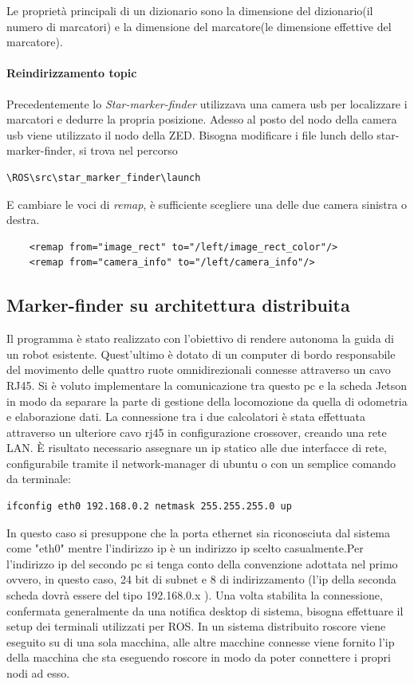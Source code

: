 \documentclass[a4paper]{article}
\begin{document}
Le proprietà principali di un dizionario sono la dimensione del dizionario(il numero di marcatori) e la dimensione del marcatore(le dimensione effettive del marcatore).
\paragraph{Reindirizzamento topic}
Precedentemente lo \textit{Star-marker-finder} utilizzava una camera usb per localizzare i marcatori e dedurre la propria posizione. Adesso al posto del nodo della camera usb viene utilizzato il nodo della ZED.
Bisogna modificare i file lunch dello star-marker-finder, si trova nel percorso
\begin{verbatim}
\ROS\src\star_marker_finder\launch
\end{verbatim}
E cambiare le voci di \textit{remap}, è sufficiente scegliere una delle due camera sinistra o destra.
\begin{verbatim}
    <remap from="image_rect" to="/left/image_rect_color"/>
    <remap from="camera_info" to="/left/camera_info"/>
\end{verbatim}

\subsection{Marker-finder su architettura distribuita}
Il programma è stato realizzato con l'obiettivo di rendere autonoma la guida di un robot esistente. 
Quest'ultimo è dotato di un computer di bordo responsabile del movimento delle quattro ruote omnidirezionali connesse attraverso un cavo RJ45.
Si è voluto implementare la comunicazione tra questo pc e la scheda Jetson in modo da separare la parte di gestione della locomozione da quella di odometria e elaborazione dati.
La connessione tra i due calcolatori è stata effettuata attraverso un ulteriore cavo rj45 in configurazione crossover, creando una rete LAN.
È risultato necessario assegnare un ip statico alle due interfacce di rete, configurabile tramite il network-manager di ubuntu o con un semplice comando da terminale:
\begin{verbatim}
ifconfig eth0 192.168.0.2 netmask 255.255.255.0 up
\end{verbatim}
In questo caso si presuppone che la porta ethernet sia riconosciuta dal sistema come "eth0" mentre l'indirizzo ip è un indirizzo ip scelto casualmente.Per l'indirizzo ip del secondo pc si tenga conto della convenzione adottata nel primo ovvero, in questo caso, 24 bit di subnet e 8 di indirizzamento (l'ip della seconda scheda dovrà essere del tipo 192.168.0.x ).
Una volta stabilita la connessione, confermata generalmente da una notifica desktop di sistema, bisogna effettuare il setup dei terminali utilizzati per ROS.
In un sistema distribuito roscore viene eseguito su di una sola macchina, alle altre macchine connesse viene fornito l'ip della macchina che sta eseguendo roscore in modo da poter connettere i propri nodi ad esso.
\end{document}

